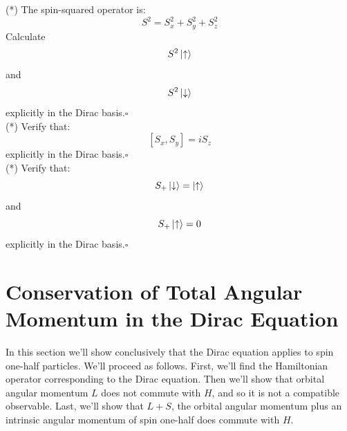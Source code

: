 \documentclass[12pt]{article}
\begin{document}
\exercise (*) The spin-squared operator is:
$$S^2 = S_x^2 + S_y^2 + S_z^2$$
Calculate
$$S^2 \ket{\uparrow}$$
and
$$S^2 \ket{\downarrow}$$
explicitly in the Dirac basis.$\square$\\[5pt]

\exercise (*) Verify that:
$$[S_x, S_y] = i  S_z$$
explicitly in the Dirac basis.$\square$\\[5pt]

\exercise (*) Verify that:
$$ S_+ \ket{\downarrow} =  \ket{\uparrow}$$
and
$$ S_+ \ket{\uparrow} = 0$$
explicitly in the Dirac basis.$\square$\\[5pt]

\section{Conservation of Total Angular Momentum in the Dirac Equation}

In this section we'll show conclusively that the Dirac equation
applies to spin one-half particles.  We'll proceed as follows. First,
we'll find the Hamiltonian operator corresponding to the Dirac
equation.  Then we'll show that orbital angular momentum $L$ does not
commute with $H$, and so it is not a compatible observable.  Last,
we'll show that $L+S$, the orbital angular momentum plus an intrinsic
angular momentum of spin one-half does commute with $H$.
\end{document}
